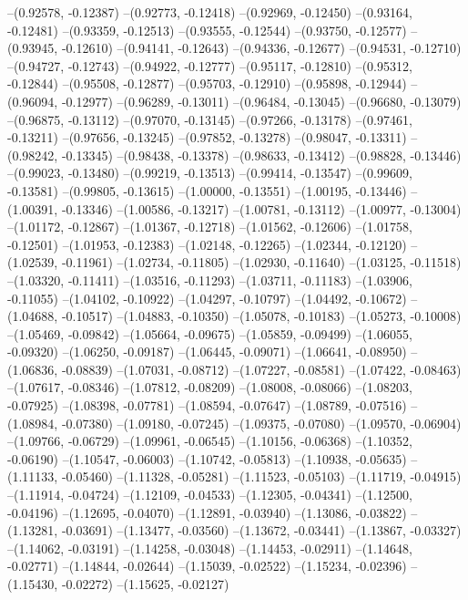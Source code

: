 --(0.92578, -0.12387)
--(0.92773, -0.12418)
--(0.92969, -0.12450)
--(0.93164, -0.12481)
--(0.93359, -0.12513)
--(0.93555, -0.12544)
--(0.93750, -0.12577)
--(0.93945, -0.12610)
--(0.94141, -0.12643)
--(0.94336, -0.12677)
--(0.94531, -0.12710)
--(0.94727, -0.12743)
--(0.94922, -0.12777)
--(0.95117, -0.12810)
--(0.95312, -0.12844)
--(0.95508, -0.12877)
--(0.95703, -0.12910)
--(0.95898, -0.12944)
--(0.96094, -0.12977)
--(0.96289, -0.13011)
--(0.96484, -0.13045)
--(0.96680, -0.13079)
--(0.96875, -0.13112)
--(0.97070, -0.13145)
--(0.97266, -0.13178)
--(0.97461, -0.13211)
--(0.97656, -0.13245)
--(0.97852, -0.13278)
--(0.98047, -0.13311)
--(0.98242, -0.13345)
--(0.98438, -0.13378)
--(0.98633, -0.13412)
--(0.98828, -0.13446)
--(0.99023, -0.13480)
--(0.99219, -0.13513)
--(0.99414, -0.13547)
--(0.99609, -0.13581)
--(0.99805, -0.13615)
--(1.00000, -0.13551)
--(1.00195, -0.13446)
--(1.00391, -0.13346)
--(1.00586, -0.13217)
--(1.00781, -0.13112)
--(1.00977, -0.13004)
--(1.01172, -0.12867)
--(1.01367, -0.12718)
--(1.01562, -0.12606)
--(1.01758, -0.12501)
--(1.01953, -0.12383)
--(1.02148, -0.12265)
--(1.02344, -0.12120)
--(1.02539, -0.11961)
--(1.02734, -0.11805)
--(1.02930, -0.11640)
--(1.03125, -0.11518)
--(1.03320, -0.11411)
--(1.03516, -0.11293)
--(1.03711, -0.11183)
--(1.03906, -0.11055)
--(1.04102, -0.10922)
--(1.04297, -0.10797)
--(1.04492, -0.10672)
--(1.04688, -0.10517)
--(1.04883, -0.10350)
--(1.05078, -0.10183)
--(1.05273, -0.10008)
--(1.05469, -0.09842)
--(1.05664, -0.09675)
--(1.05859, -0.09499)
--(1.06055, -0.09320)
--(1.06250, -0.09187)
--(1.06445, -0.09071)
--(1.06641, -0.08950)
--(1.06836, -0.08839)
--(1.07031, -0.08712)
--(1.07227, -0.08581)
--(1.07422, -0.08463)
--(1.07617, -0.08346)
--(1.07812, -0.08209)
--(1.08008, -0.08066)
--(1.08203, -0.07925)
--(1.08398, -0.07781)
--(1.08594, -0.07647)
--(1.08789, -0.07516)
--(1.08984, -0.07380)
--(1.09180, -0.07245)
--(1.09375, -0.07080)
--(1.09570, -0.06904)
--(1.09766, -0.06729)
--(1.09961, -0.06545)
--(1.10156, -0.06368)
--(1.10352, -0.06190)
--(1.10547, -0.06003)
--(1.10742, -0.05813)
--(1.10938, -0.05635)
--(1.11133, -0.05460)
--(1.11328, -0.05281)
--(1.11523, -0.05103)
--(1.11719, -0.04915)
--(1.11914, -0.04724)
--(1.12109, -0.04533)
--(1.12305, -0.04341)
--(1.12500, -0.04196)
--(1.12695, -0.04070)
--(1.12891, -0.03940)
--(1.13086, -0.03822)
--(1.13281, -0.03691)
--(1.13477, -0.03560)
--(1.13672, -0.03441)
--(1.13867, -0.03327)
--(1.14062, -0.03191)
--(1.14258, -0.03048)
--(1.14453, -0.02911)
--(1.14648, -0.02771)
--(1.14844, -0.02644)
--(1.15039, -0.02522)
--(1.15234, -0.02396)
--(1.15430, -0.02272)
--(1.15625, -0.02127)
